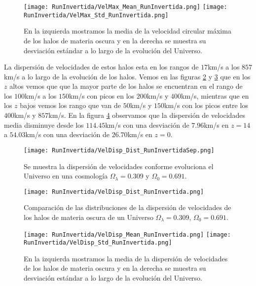\begin{figure}[H]
    \centering
    \texttt{[image: RunInvertida/VelMax\_Mean\_RunInvertida.png]}
    \texttt{[image: RunInvertida/VelMax\_Std\_RunInvertida.png]}
    \caption[Media y desviación estándar de la velocidad circular máxima]{\footnotesize En la izquierda mostramos la media de la velocidad circular máxima de los halos de materia oscura y en la derecha se muestra su desviación estándar a lo largo de la evolución del Universo.}
    \label{fig:Invertida-VelMaxStats}
\end{figure}


La dispersión de velocidades de estos halos esta en los rangos de $17$km/s a los $857$km/s a lo largo de la evolución de los halos. Vemos en las figuras \ref{fig:Invertida-VelDispDistSep} y \ref{fig:Invertida-VelDispDist} que en los $z$ altos vemos que que la mayor parte de los halos se encuentran en el rango de los $100$km/s a los $150$km/s con picos en los $200$km/s y $400$km/s, mientras que en los $z$ bajos vemos los rango que van de $50$km/s y $150$km/s con los picos entre los $400$km/s y $857$km/s. En la figura \ref{fig:Invertida-VelDispStats} observamos que la dispersión de velocidades media disminuye desde los $114.45$km/s con una desviación de $7.96$km/s en $z=14$ a $54.03$km/s con una desviación de $26.70$km/s en $z=0$.


\begin{figure}[H]
    \centering
    \texttt{[image: RunInvertida/VelDisp\_Dist\_RunInvertidaSep.png]}
    \caption[Dispersión de velocidades]{\footnotesize Se muestra la dispersión de velocidades conforme evoluciona el Universo en una cosmología $\Omega_\lambda = 0.309 $ y $\Omega_0 = 0.691$.}
    \label{fig:Invertida-VelDispDistSep}
\end{figure}

\begin{figure}[H]
    \centering
    \texttt{[image: RunInvertida/VelDisp\_Dist\_RunInvertida.png]}
    \caption[Distribución de la dispersión de velocidades]{\footnotesize Comparación de las distribuciones de la dispersión de velocidades de los halos de materia oscura de un Universo $\Omega_\lambda = 0.309 $, $\Omega_0 = 0.691$.}
    \label{fig:Invertida-VelDispDist}
\end{figure}

\begin{figure}[H]
    \centering
    \texttt{[image: RunInvertida/VelDisp\_Mean\_RunInvertida.png]}
    \texttt{[image: RunInvertida/VelDisp\_Std\_RunInvertida.png]}
    \caption[Media y desviación estándar de la dispersión de velocidades]{\footnotesize En la izquierda mostramos la media de la dispersión de velocidades de los halos de materia oscura y en la derecha se muestra su desviación estándar a lo largo de la evolución del Universo.}
    \label{fig:Invertida-VelDispStats}
\end{figure}

